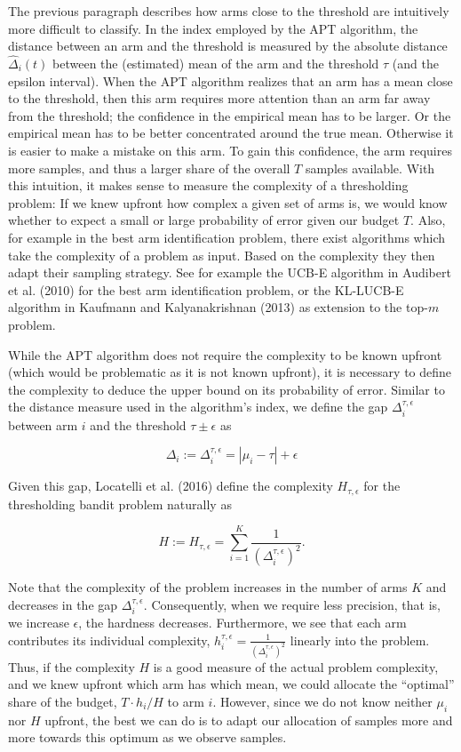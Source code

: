 \documentclass[11pt,]{article}
\begin{document}
The previous paragraph describes how arms close to the threshold are
intuitively more difficult to classify. In the index employed by the APT
algorithm, the distance between an arm and the threshold is measured by
the absolute distance \(\hat{\Delta}_i(t)\) between the (estimated) mean
of the arm and the threshold \(\tau\) (and the epsilon interval). When
the APT algorithm realizes that an arm has a mean close to the
threshold, then this arm requires more attention than an arm far away
from the threshold; the confidence in the empirical mean has to be
larger. Or the empirical mean has to be better concentrated around the
true mean. Otherwise it is easier to make a mistake on this arm. To gain
this confidence, the arm requires more samples, and thus a larger share
of the overall \(T\) samples available. With this intuition, it makes
sense to measure the complexity of a thresholding problem: If we knew
upfront how complex a given set of arms is, we would know whether to
expect a small or large probability of error given our budget \(T\).
Also, for example in the best arm identification problem, there exist
algorithms which take the complexity of a problem as input. Based on the
complexity they then adapt their sampling strategy. See for example the
UCB-E algorithm in Audibert et al. (2010) for the best arm
identification problem, or the KL-LUCB-E algorithm in Kaufmann and
Kalyanakrishnan (2013) as extension to the top-\(m\) problem.

While the APT algorithm does not require the complexity to be known
upfront (which would be problematic as it is not known upfront), it is
necessary to define the complexity to deduce the upper bound on its
probability of error. Similar to the distance measure used in the
algorithm's index, we define the gap \(\Delta_i^{\tau,\epsilon}\)
between arm \(i\) and the threshold \(\tau \pm \epsilon\) as

\[
\Delta_i := \Delta_i^{\tau,\epsilon} = |\mu_i - \tau| + \epsilon
\]

Given this gap, Locatelli et al. (2016) define the complexity
\(H_{\tau, \epsilon}\) for the thresholding bandit problem naturally as

\[
H := H_{\tau, \epsilon} = \sum_{i=1}^K \frac{1}{(\Delta_i^{\tau,\epsilon})^2}.
\]

Note that the complexity of the problem increases in the number of arms
\(K\) and decreases in the gap \(\Delta_i^{\tau,\epsilon}\).
Consequently, when we require less precision, that is, we increase
\(\epsilon\), the hardness decreases. Furthermore, we see that each arm
contributes its individual complexity,
\(h_i^{\tau,\epsilon} = \frac{1}{(\Delta_i^{\tau,\epsilon})^2}\)
linearly into the problem. Thus, if the complexity \(H\) is a good
measure of the actual problem complexity, and we knew upfront which arm
has which mean, we could allocate the ``optimal'' share of the budget,
\(T \cdot h_i /H\) to arm \(i\). However, since we do not know neither
\(\mu_i\) nor \(H\) upfront, the best we can do is to adapt our
allocation of samples more and more towards this optimum as we observe
samples.
\end{document}
